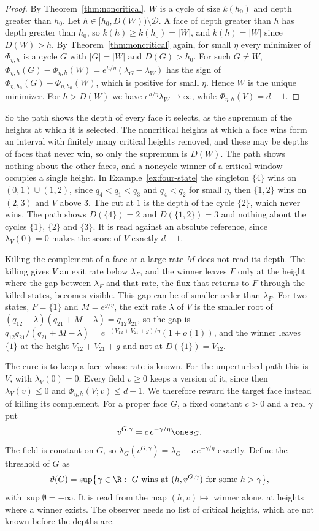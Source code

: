 \begin{proof}
By Theorem~\ref{thm:noncritical}, $W$ is a cycle of size $k(h_0)$ and depth
greater than $h_0$. Let $h\in[h_0,D(W))\setminus\mathcal D$. A face of depth
greater than $h$ has depth greater than $h_0$, so $k(h)\ge k(h_0)=|W|$, and
$k(h)=|W|$ since $D(W)>h$. By Theorem~\ref{thm:noncritical} again, for small
$\eta$ every minimizer of $\Phi_{\eta,h}$ is a cycle $G$ with $|G|=|W|$ and
$D(G)>h_0$. For such $G\ne W$,
$\Phi_{\eta,h}(G)-\Phi_{\eta,h}(W)=e^{h/\eta}(\lambda_G-\lambda_W)$ has the sign
of $\Phi_{\eta,h_0}(G)-\Phi_{\eta,h_0}(W)$, which is positive for small $\eta$.
Hence $W$ is the unique minimizer. For $h>D(W)$ we have
$e^{h/\eta}\lambda_W\to\infty$, while $\Phi_{\eta,h}(V)=d-1$.
\end{proof}

So the path shows the depth of every face it selects, as the supremum of the
heights at which it is selected. The noncritical heights at which a face wins
form an interval with finitely many critical heights removed, and these may be
depths of faces that never win, so only the supremum is $D(W)$. The path shows
nothing about the other faces, and a noncycle winner of a critical window
occupies a single height. In Example~\ref{ex:four-state} the singleton $\{4\}$
wins on $(0,1)\cup(1,2)$, since $q_4<q_1<q_3$ and $q_4<q_2$ for small $\eta$,
then $\{1,2\}$ wins on $(2,3)$ and $V$ above $3$. The cut at $1$ is the depth
of the cycle $\{2\}$, which never wins. The path shows $D(\{4\})=2$ and
$D(\{1,2\})=3$ and nothing about the cycles $\{1\}$, $\{2\}$ and $\{3\}$. It is
read against an absolute reference, since $\lambda_V(0)=0$ makes the score of
$V$ exactly $d-1$.

Killing the complement of a face at a large rate $M$ does not read its depth. The
killing gives $V$ an exit rate below $\lambda_F$, and the winner leaves $F$ only at the
height where the gap between $\lambda_F$ and that rate, the flux that returns to $F$
through the killed states, becomes visible. This gap can be of smaller order than
$\lambda_F$. For two states, $F=\{1\}$ and $M=e^{g/\eta}$, the exit rate $\lambda$ of $V$
is the smaller root of $(q_{12}-\lambda)(q_{21}+M-\lambda)=q_{12}q_{21}$, so the gap is
$q_{12}q_{21}/(q_{21}+M-\lambda)=e^{-(V_{12}+V_{21}+g)/\eta}(1+o(1))$, and the winner leaves
$\{1\}$ at the height $V_{12}+V_{21}+g$ and not at $D(\{1\})=V_{12}$.

The cure is to keep a face whose rate is known. For the unperturbed path this
is $V$, with $\lambda_V(0)=0$. Every field $v\ge0$ keeps a version of it, since
then $\lambda_V(v)\le0$ and $\Phi_{\eta,h}(V;v)\le d-1$. We therefore reward the
target face instead of killing its complement. For a proper face $G$, a fixed
constant $c>0$ and a real $\gamma$ put
\[
 v^{G,\gamma}=c\,e^{-\gamma/\eta}\ones_G .
\]
The field is constant on $G$, so $\lambda_G(v^{G,\gamma})=\lambda_G-c\,e^{-\gamma/\eta}$
exactly. Define the threshold of $G$ as
\[
 \vartheta(G)=\sup\bigl\{\gamma\in\R:\ G\text{ wins at }(h,v^{G,\gamma})\text{ for some }h>\gamma\bigr\},
\]
with $\sup\emptyset=-\infty$. It is read from the map $(h,v)\mapsto$ winner alone,
at heights where a winner exists. The observer needs no list of critical
heights, which are not known before the depths are.

